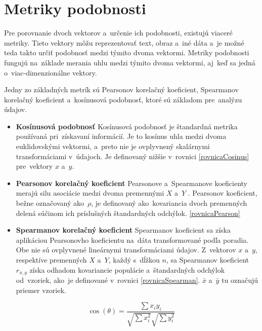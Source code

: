 \section{Metriky podobnosti} \label{podobnost}

Pre porovnanie dvoch vektorov a~určenie ich podobnosti, existujú viaceré metriky. Tieto vektory môžu reprezentovať text, obraz a~iné dáta a~je možné teda takto určiť podobnosť medzi týmito dvoma vektormi. Metriky podobnosti fungujú na~základe merania uhlu medzi týmito dvoma vektormi, aj~keď sa jedná o~viac-dimenzionálne vektory. 

Jedny zo základných metrík sú Pearsonov korelačný koeficient, Spearmanov korelačný koeficient a~kosínusová podobnosť, ktoré sú základom pre~analýzu údajov.

\begin{itemize}
    \item \textbf{Kosínusová podobnosť} Kosínusová podobnosť je štandardná metrika používaná pri~získavaní informácií. Je to kosínus uhla medzi dvoma euklidovskými vektormi, a~preto nie je ovplyvnený skalárnymi transformáciami v~údajoch. Je definovaný nižšie v~rovnici \eqref{rovnicaCosinus} pre~vektory \(x\) a~\(y\).
    
    \item \textbf{Pearsonov korelačný koeficient} Pearsonove a~Spearmanove koeficienty merajú silu asociácie medzi dvoma premennými \(X\) a~\(Y\) . Pearsonov koeficient, bežne označovaný ako~\(\rho\), je definovaný ako~kovariancia dvoch premenných delená súčinom ich príslušných štandardných odchýlok. \eqref{rovnicaPearson}
    
    \item \textbf{Spearmanov korelačný koeficient} Spearmanov koeficient sa získa aplikáciou Pearsonovho koeficientu na~dáta transformované podľa poradia. Obe nie sú ovplyvnené lineárnymi transformáciami údajov. Z~vektorov \(x\) a~\(y\), respektíve premenných \(X\) a~\(Y\), každý s~dĺžkou \(n\), sa Spearmanov koeficient \(r_{x,y}\) získa odhadom kovariancie populácie a~štandardných odchýlok od~vzoriek, ako~je definované v~rovnici \eqref{rovnicaSpearman}. \(\bar{x}\) a~\(\bar{y}\) tu označujú priemer vzoriek. \cite{Dongen:2012}
\end{itemize}

\begin{equation}
	\cos(\theta) =  \dfrac{\sum{x_{i}y_{i}}}{\sqrt{\sum{x_{i}^2}}\sqrt{\sum{y_{i}^2}}} \label{rovnicaCosinus}
\end{equation}

